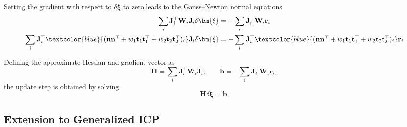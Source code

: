 Setting the gradient with respect to \(\delta\bm{\xi}\) to zero leads to the
Gauss--Newton normal equations
\begin{equation}
\begin{split}
\sum_i \mathbf{J}_i^\top \mathbf{W}_i \mathbf{J}_i 
\delta\bm{\xi} &= -\sum_i \mathbf{J}_i^\top \mathbf{W}_i \mathbf{r}_i \\
\sum_i \mathbf{J}_i^\top \textcolor{blue}{(\mathbf{n}\mathbf{n}^\top + w_1\mathbf{t}_1\mathbf{t}_1^\top + w_2\mathbf{t}_2\mathbf{t}_2^\top)_i} \mathbf{J}_i 
\delta\bm{\xi} &= -\sum_i \mathbf{J}_i^\top \textcolor{blue}{(    \mathbf{n}\mathbf{n}^\top + w_1\mathbf{t}_1\mathbf{t}_1^\top + w_2\mathbf{t}_2\mathbf{t}_2^\top)_i} \mathbf{r}_i
\end{split}
\end{equation}

Defining the approximate Hessian and gradient vector as
\begin{equation}
\mathbf{H}
=
\sum_i
\mathbf{J}_i^\top \mathbf{W}_i \mathbf{J}_i,
\qquad
\mathbf{b}
=
-
\sum_i
\mathbf{J}_i^\top \mathbf{W}_i \mathbf{r}_i,
\end{equation}
the update step is obtained by solving
\begin{equation}
\mathbf{H}\delta\bm{\xi} = \mathbf{b}.
\end{equation}

\subsection{Extension to Generalized ICP}


